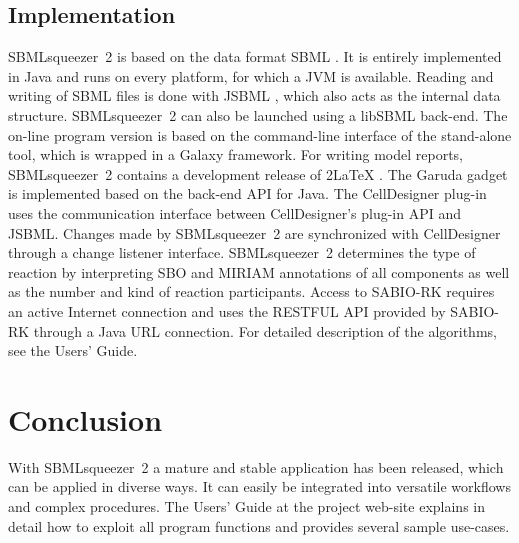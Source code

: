 \documentclass{bioinfo}
\newcommand{\SBMLLaTeX}{{\sffamily\upshape\raisebox{-.35ex}{S\hspace{-.425ex}BML}\hspace{-0.5ex}2\LaTeX}}
\begin{document}
\vspace{-.45cm}
\begin{methods}
\section{Implementation}
SBMLsqueezer~2 is based on the data format SBML \citep{Hucka2004}.
It is entirely implemented in Java\texttrademark{} and runs on every platform, for which a JVM is available.
Reading and writing of SBML files is done with JSBML \citep{Draeger2011b}, which also acts as the internal data structure.
SBMLsqueezer~2 can also be launched using a libSBML \citep{Bornstein2008} back-end.
The on-line program version is based on the command-line interface of the stand-alone tool, which is wrapped in a Galaxy \citep{Goecks2010} framework.
For writing model reports, SBMLsqueezer~2 contains a development release of \SBMLLaTeX{} \citep{Draeger2009}.
The Garuda gadget \citep{Ghosh2011} is implemented based on the back-end API for Java\texttrademark.
The CellDesigner plug-in uses the communication interface between CellDesigner's plug-in API and JSBML.
Changes made by SBMLsqueezer~2 are synchronized with CellDesigner through a change listener interface.
SBMLsqueezer~2 determines the type of reaction by interpreting SBO and MIRIAM annotations \citep{Courtot2011} of all components as well as the number and kind of reaction participants.
Access to SABIO-RK \citep{Wittig2012} requires an active Internet connection and uses the RESTFUL API provided by SABIO-RK through a Java\texttrademark{} URL connection.
For detailed description of the algorithms, see the Users' Guide.
\end{methods}

%
%
\section{Conclusion}

With SBMLsqueezer~2 a mature and stable application has been released, which can be applied in diverse ways.
It can easily be integrated into versatile workflows and complex procedures.
The Users' Guide at the project web-site
explains in detail
how to exploit all program functions 
and provides several sample use-cases.
\end{document}
